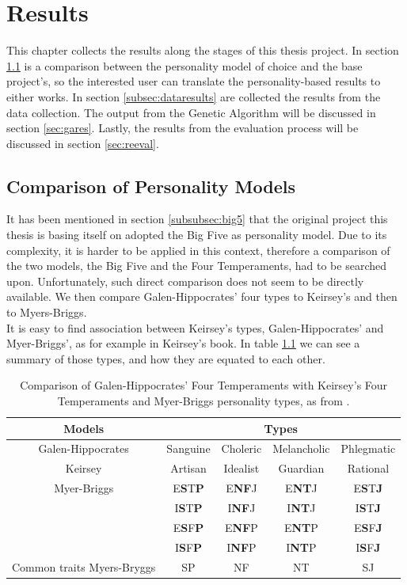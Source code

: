 \chapter{Results}\label{sec:results}
This chapter collects the results along the stages of this thesis project. In section \ref{subsec:fourvsfive} is a comparison between the personality model of choice and the base project's, so the interested user can translate the personality-based results to either works. In section \ref{subsec:dataresults} are collected the results from the data collection. The output from the Genetic Algorithm will be discussed in section \ref{sec:gares}. Lastly, the results from the evaluation process will be discussed in section \ref{sec:reeval}.
\section{Comparison of Personality Models}\label{subsec:fourvsfive}
It has been mentioned in section \ref{subsubsec:big5} that the original project this thesis is basing itself on adopted the Big Five as personality model. Due to its complexity, it is harder to be applied in this context, therefore a comparison of the two models, the Big Five and the Four Temperaments, had to be searched upon. Unfortunately, such direct comparison does not seem to be directly available. We then compare Galen-Hippocrates' four types to Keirsey's and then to Myers-Briggs.\\
It is easy to find association between Keirsey's types, Galen-Hippocrates' and Myer-Briggs', as for example in Keirsey's book\cite{keirsey1998please}.  In table \ref{tab:keirsey} we can see a summary of those types, and how they are equated to each other.
\begin{table}[H]
	\caption{Comparison of Galen-Hippocrates' Four Temperaments with Keirsey's Four Temperaments and Myer-Briggs personality types, as from \cite{keirsey1998please}.}
    \centering
    \scriptsize
    \begin{tabular}{|c|c|c|c|c|}
    \hline
    Models & \multicolumn{4}{|c|}{Types} \\
		\hline
        \hline
        Galen-Hippocrates & Sanguine & Choleric & Melancholic & Phlegmatic\\
        \hline
        Keirsey & Artisan & Idealist & Guardian & Rational\\
        \hline
        Myer-Briggs & E\textbf{S}T\textbf{P} & E\textbf{NF}J & E\textbf{NT}J & E\textbf{S}T\textbf{J} \\
       				& I\textbf{S}T\textbf{P} & I\textbf{NF}J & I\textbf{NT}J & I\textbf{S}T\textbf{J} \\
                    & E\textbf{S}F\textbf{P} & E\textbf{NF}P & E\textbf{NT}P & E\textbf{S}F\textbf{J} \\
                    & I\textbf{S}F\textbf{P} & I\textbf{NF}P & I\textbf{NT}P & I\textbf{S}F\textbf{J} \\
        \hline
        Common traits Myers-Bryggs & SP & NF & NT & SJ \\
        \hline
    \end{tabular}
    \label{tab:keirsey}
\end{table}
